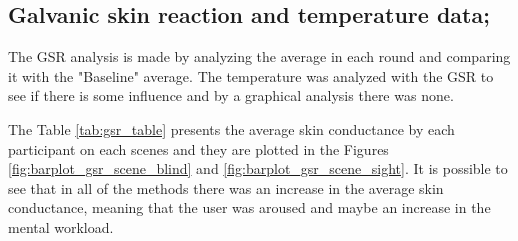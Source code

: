 \subsection{Galvanic skin reaction and temperature data;}
\label{subsec:results_gsr_temp}

The GSR analysis is made by analyzing the average in each round and comparing it with the "Baseline" average. The temperature was analyzed with the GSR to see if there is some influence and by a graphical analysis there was none.

The Table \ref{tab:gsr_table} presents the average skin conductance by each participant on each scenes and they are plotted in the Figures \ref{fig:barplot_gsr_scene_blind} and \ref{fig:barplot_gsr_scene_sight}. It is possible to see that in all of the methods there was an increase in the average skin conductance, meaning that the user was aroused and maybe an increase in the mental workload.



